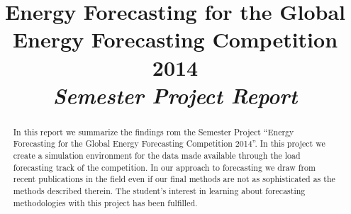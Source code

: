 \documentclass[conference]{IEEEtran}
\begin{document}
%
\title{Energy Forecasting for the Global Energy Forecasting Competition 2014\\[10pt]\Large{\emph{Semester Project Report}}}

\author{
\and
{}
}

\maketitle

\begin{abstract}
In this report we summarize the findings rom the Semester Project ``Energy Forecasting for the Global Energy Forecasting Competition 2014''. In this project we create a simulation environment for the data made available through the load forecasting track of the competition. In our approach to forecasting we draw from recent publications in the field even if our final methods are not as sophisticated as the methods described therein. The student's interest in learning about forecasting methodologies with this project has been fulfilled.
\end{abstract}

\end{document}
